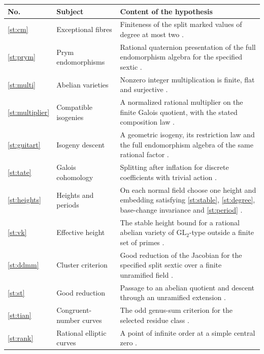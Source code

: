 \documentclass[10pt,a4paper]{article}
\begin{document}
\begingroup\renewcommand{\arraystretch}{1.32}
\begin{tabularx}{\linewidth}{@{}l l X@{}}
\toprule
\textbf{No.} & \textbf{Subject} & \textbf{Content of the hypothesis}\\\midrule
\hyperref[st:cm]{\ref*{st:cm}} & Exceptional fibres & Finiteness of the split marked values of degree at most two \cite{Laga}.\\
\hyperref[st:prym]{\ref*{st:prym}} & Prym endomorphisms & Rational quaternion presentation of the full endomorphism algebra for the specified sextic \cite{Laga,RR}.\\
\hyperref[st:multi]{\ref*{st:multi}} & Abelian varieties & Nonzero integer multiplication is finite, flat and surjective \cite{MilneAV}.\\
\hyperref[st:multiplier]{\ref*{st:multiplier}} & Compatible isogenies & A normalized rational multiplier on the finite Galois quotient, with the stated composition law \cite{Guitart}.\\
\hyperref[st:guitart]{\ref*{st:guitart}} & Isogeny descent & A geometric isogeny, its restriction law and the full endomorphism algebra of the same rational factor \cite{Guitart}.\\
\hyperref[st:tate]{\ref*{st:tate}} & Galois cohomology & Splitting after inflation for discrete coefficients with trivial action \cite{Ribet}.\\
\hyperref[st:heights]{\ref*{st:heights}} & Heights and periods & On each normal field choose one height and embedding satisfying \hyperref[st:stable]{\ref*{st:stable}}, \hyperref[st:degree]{\ref*{st:degree}}, base-change invariance and \hyperref[st:period]{\ref*{st:period}} \cite{Streng,MilneJV,Pazuki,GR,vK}.\\
\hyperref[st:vk]{\ref*{st:vk}} & Effective height & The stable height bound for a rational abelian variety of $\mathrm{GL}_2$-type outside a finite set of primes \cite{vK}.\\
\hyperref[st:ddmm]{\ref*{st:ddmm}} & Cluster criterion & Good reduction of the Jacobian for the specified split sextic over a finite unramified field \cite{DDMM}.\\
\hyperref[st:st]{\ref*{st:st}} & Good reduction & Passage to an abelian quotient and descent through an unramified extension \cite{SerreTate}.\\
\hyperref[st:tian]{\ref*{st:tian}} & Congruent-number curves & The odd genus-sum criterion for the selected residue class \cite{Tian}.\\
\hyperref[st:rank]{\ref*{st:rank}} & Rational elliptic curves & A point of infinite order at a simple central zero \cite{GrossZagier,Modularity}.\\
\bottomrule
\end{tabularx}\endgroup
\end{document}

